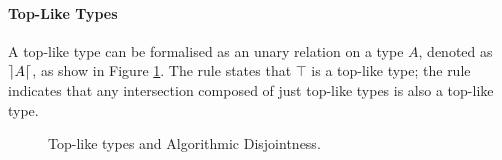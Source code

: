 \paragraph{Top-Like Types}


A top-like type can be formalised as an unary relation on a type $A$, denoted as $\rceil A \lceil$, as show in 
Figure \ref{fig:tltypesdis}.
The rule  states that $\top$ is a top-like type; 
the rule  indicates that any 
intersection composed of just top-like types is also a top-like type.

\begin{figure}[t]


  \caption{Top-like types and Algorithmic Disjointness.}
  \label{fig:tltypesdis}
\end{figure}




